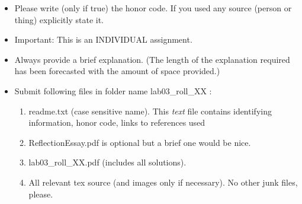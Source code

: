 \documentclass[11pt]{article}
\begin{document}
\titleline{\semester}
\begin{itemize}
\item Please write (only if true) the honor code. If you used any
  source (person or thing) explicitly state it. 

\item Important: This is an INDIVIDUAL assignment.

\item Always provide a brief explanation. (The length of the
  explanation required has been forecasted with the amount of space
  provided.)
  
\item Submit following files in folder name lab03\_roll\_XX :
	\begin{enumerate}
      \item readme.txt (case sensitive name). This \emph{text} file
        contains identifying information, honor code, links to
        references used 
      \item ReflectionEssay.pdf is optional but a brief one would be nice.
      \item lab03\_roll\_XX.pdf (includes all solutions). 
      \item All relevant tex source (and images only if necessary). No
        other junk files, please.
     \end{enumerate}
\end{itemize} 
\end{document}

